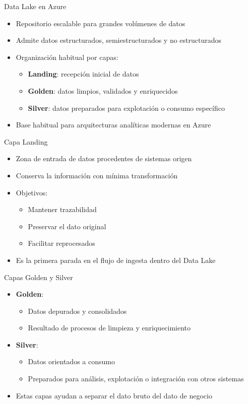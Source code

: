 \documentclass{beamer}
\begin{document}
\begin{frame}{Data Lake en Azure}
\begin{itemize}
    \item Repositorio escalable para grandes volúmenes de datos
    \item Admite datos estructurados, semiestructurados y no estructurados
    \item Organización habitual por capas:
    \begin{itemize}
        \item \textbf{Landing}: recepción inicial de datos
        \item \textbf{Golden}: datos limpios, validados y enriquecidos
        \item \textbf{Silver}: datos preparados para explotación o consumo específico
    \end{itemize}
    \item Base habitual para arquitecturas analíticas modernas en Azure
\end{itemize}
\end{frame}

\begin{frame}{Capa Landing}
\begin{itemize}
    \item Zona de entrada de datos procedentes de sistemas origen
    \item Conserva la información con mínima transformación
    \item Objetivos:
    \begin{itemize}
        \item Mantener trazabilidad
        \item Preservar el dato original
        \item Facilitar reprocesados
    \end{itemize}
    \item Es la primera parada en el flujo de ingesta dentro del Data Lake
\end{itemize}
\end{frame}

\begin{frame}{Capas Golden y Silver}
\begin{itemize}
    \item \textbf{Golden}:
    \begin{itemize}
        \item Datos depurados y consolidados
        \item Resultado de procesos de limpieza y enriquecimiento
    \end{itemize}
    \item \textbf{Silver}:
    \begin{itemize}
        \item Datos orientados a consumo
        \item Preparados para análisis, explotación o integración con otros sistemas
    \end{itemize}
    \item Estas capas ayudan a separar el dato bruto del dato de negocio
\end{itemize}
\end{frame}
\end{document}
